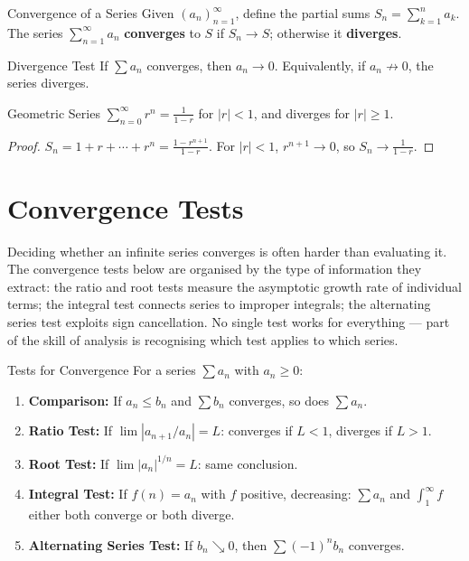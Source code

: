 \documentclass[12pt, openany]{book}
\theoremstyle{plain}
\theoremstyle{definition}
\theoremstyle{remark}
\begin{document}
\begin{defbox}{Convergence of a Series}
Given $(a_n)_{n=1}^\infty$, define the partial sums $S_n = \sum_{k=1}^n a_k$.
The series $\sum_{n=1}^\infty a_n$ \textbf{converges} to $S$ if $S_n \to S$; otherwise it \textbf{diverges}.
\end{defbox}
\color{black}

\begin{thmbox}{Divergence Test}
If $\sum a_n$ converges, then $a_n \to 0$.
Equivalently, if $a_n \not\to 0$, the series diverges.
\end{thmbox}
\color{black}

\begin{thmbox}{Geometric Series}
$\sum_{n=0}^\infty r^n = \frac{1}{1-r}$ for $|r| < 1$, and diverges for $|r| \geq 1$.
\end{thmbox}
\color{black}

\begin{proof}
$S_n = 1 + r + \cdots + r^n = \frac{1-r^{n+1}}{1-r}$. For $|r| < 1$, $r^{n+1} \to 0$, so $S_n \to \frac{1}{1-r}$.
\end{proof}

\section{Convergence Tests}

Deciding whether an infinite series converges is often harder than evaluating it.  The convergence tests below are organised by the type of information they extract: the ratio and root tests measure the asymptotic growth rate of individual terms; the integral test connects series to improper integrals; the alternating series test exploits sign cancellation.  No single test works for everything --- part of the skill of analysis is recognising which test applies to which series.

\begin{thmbox}{Tests for Convergence}
For a series $\sum a_n$ with $a_n \geq 0$:
\begin{enumerate}[noitemsep]
  \item \textbf{Comparison:} If $a_n \leq b_n$ and $\sum b_n$ converges, so does $\sum a_n$.
  \item \textbf{Ratio Test:} If $\lim |a_{n+1}/a_n| = L$: converges if $L < 1$, diverges if $L > 1$.
  \item \textbf{Root Test:} If $\lim |a_n|^{1/n} = L$: same conclusion.
  \item \textbf{Integral Test:} If $f(n) = a_n$ with $f$ positive, decreasing: $\sum a_n$ and $\int_1^\infty f$ either both converge or both diverge.
  \item \textbf{Alternating Series Test:} If $b_n \searrow 0$, then $\sum (-1)^n b_n$ converges.
\end{enumerate}
\end{thmbox}
\color{black}
\end{document}
